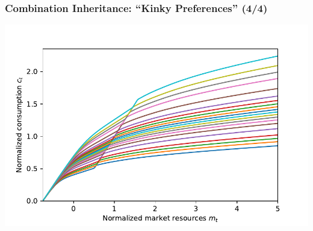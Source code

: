 \documentclass{beamer}
\begin{document}
\begin{frame}
  \frametitle{Combination Inheritance: ``Kinky Preferences'' (4/4)}

  \begin{center}
     \includegraphics[scale=0.75]{KinkyPrefcFunc.pdf}
  \end{center}

\end{frame}
\end{document}
